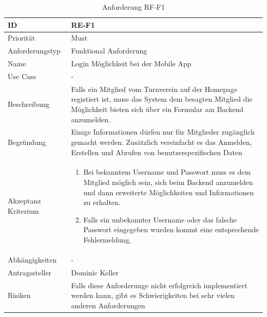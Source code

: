 \begin{table}[ht]
\centering
  \begin{tabular}{ l | p{8cm} }
	\hline
	\rowcolor{gray}
	ID 			&	\textbf{RE-F1}\\ \hline
	Priorität 		&	Must\\ \hline
	Anforderungstyp	&	Funktional Anforderung\\ \hline
	Name 			&	Login Möglichkeit bei der Mobile App\\ \hline
	Use Case 		&	-\\ \hline
	Beschreibung 	&	Falls ein Mitglied vom Turnverein auf der Homepage registiert ist, muss das System dem besagten Mitglied die Möglichkeit bieten sich über ein Formular am Backend anzumelden.\\ \hline
	Begründung 		&	Einige Informationen dürfen nur für Mitglieder zugänglich
					gemacht werden. Zusätzlich vereinfacht es das Anmelden, Erstellen
					und Abrufen von benutzerspezifischen Daten\\ \hline
	Akzeptanz Kriterium	&	\begin{enumerate}
					\item Bei bekanntem Username und Passwort muss es dem Mitglied möglich sein, sich beim Backend anzumelden und dann erweiterte	Möglichkeiten und Informationen zu erhalten.
					\item Falls ein unbekannter Username oder das falsche Passwort eingegeben wurden kommt eine entsprechende Fehlermeldung.
					\end{enumerate}
					\\ \hline
	Abhängigkeiten 	&	-\\ \hline
	Antragssteller 	&	Dominic Keller\\ \hline
	Risiken	 	&	Falls diese Anforderunge nicht erfolgreich implementiert werden kann, gibt es Schwierigkeiten bei sehr vielen anderen Anforderungen
  \end{tabular}
   \caption{Anforderung RF-F1}\label{table:req_1}
\end{table}

